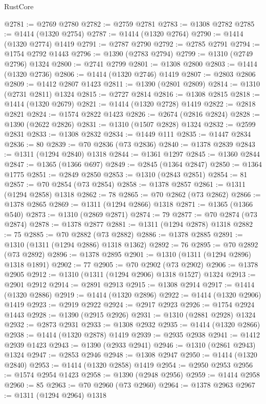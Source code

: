 \begin{lexlean}{RustCore}
\begin{coremodule}
@2781 := @2769 @2780
@2782 := @2759 @2781
@2783 := @1308 @2782
@2785 := @1414 (@1320 @2754)
@2787 := @1414 (@1320 @2764)
@2790 := @1414 (@1320 @2774) @1419
@2791 := @2787 @2790
@2792 := @2785 @2791
@2794 := @1754 @2792 @1443
@2796 := @1390 (@2783 @2794)
@2799 := @1310 (@2749 @2796) @1324
@2800 := @2741 @2799
@2801 := @1308 @2800
@2803 := @1414 (@1320 @2736)
@2806 := @1414 (@1320 @2746) @1419
@2807 := @2803 @2806
@2809 := @1412 @2807 @1423
@2811 := @1390 (@2801 @2809)
@2814 := @1310 (@2731 @2811) @1324
@2815 := @2727 @2814
@2816 := @1308 @2815
@2818 := @1414 (@1320 @2679)
@2821 := @1414 (@1320 @2728) @1419
@2822 := @2818 @2821
@2824 := @1574 @2822 @1423
@2826 := @2674 (@2816 @2824)
@2828 := @1390 (@2622 @2826)
@2831 := @1310 (@1507 @2828) @1324
@2832 := @2599 @2831
@2833 := @1308 @2832
@2834 := @1449 @111
@2835 := @1447 @2834
@2836 := 80
@2839 := @70 @2836 (@73 @2836)
@2840 := @1378 @2839
@2843 := @1311 (@1294 @2840) @1318
@2844 := @1361 @1297
@2845 := @1360 @2844
@2847 := @1365 (@1366 @697)
@2849 := @2845 (@1364 @2847)
@2850 := @1364 @1775
@2851 := @2849 @2850
@2853 := @1310 (@2843 @2851)
@2854 := 81
@2857 := @70 @2854 (@73 @2854)
@2858 := @1378 @2857
@2861 := @1311 (@1294 @2858) @1318
@2862 := 78
@2865 := @70 @2862 (@73 @2862)
@2866 := @1378 @2865
@2869 := @1311 (@1294 @2866) @1318
@2871 := @1365 (@1366 @540)
@2873 := @1310 (@2869 @2871)
@2874 := 79
@2877 := @70 @2874 (@73 @2874)
@2878 := @1378 @2877
@2881 := @1311 (@1294 @2878) @1318
@2882 := 75
@2885 := @70 @2882 (@73 @2882)
@2886 := @1378 @2885
@2891 := @1310 (@1311 (@1294 @2886) @1318 @1362)
@2892 := 76
@2895 := @70 @2892 (@73 @2892)
@2896 := @1378 @2895
@2901 := @1310 (@1311 (@1294 @2896) @1318 @1891)
@2902 := 77
@2905 := @70 @2902 (@73 @2902)
@2906 := @1378 @2905
@2912 := @1310 (@1311 (@1294 @2906) @1318 @1527) @1324
@2913 := @2901 @2912
@2914 := @2891 @2913
@2915 := @1308 @2914
@2917 := @1414 (@1320 @2886)
@2919 := @1414 (@1320 @2896)
@2922 := @1414 (@1320 @2906) @1419
@2923 := @2919 @2922
@2924 := @2917 @2923
@2926 := @1754 @2924 @1443
@2928 := @1390 (@2915 @2926)
@2931 := @1310 (@2881 @2928) @1324
@2932 := @2873 @2931
@2933 := @1308 @2932
@2935 := @1414 (@1320 @2866)
@2938 := @1414 (@1320 @2878) @1419
@2939 := @2935 @2938
@2941 := @1412 @2939 @1423
@2943 := @1390 (@2933 @2941)
@2946 := @1310 (@2861 @2943) @1324
@2947 := @2853 @2946
@2948 := @1308 @2947
@2950 := @1414 (@1320 @2840)
@2953 := @1414 (@1320 @2858) @1419
@2954 := @2950 @2953
@2956 := @1574 @2954 @1423
@2958 := @1390 (@2948 @2956)
@2959 := @1414 @2958
@2960 := 85
@2963 := @70 @2960 (@73 @2960)
@2964 := @1378 @2963
@2967 := @1311 (@1294 @2964) @1318

\end{coremodule}
\end{lexlean}
